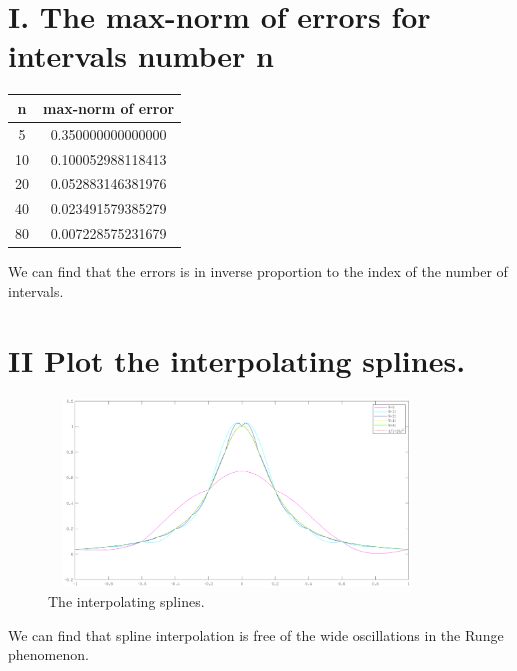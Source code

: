 \documentclass[twoside,a4paper]{article}
\begin{document}
\pagestyle{fancy}
\fancyhead{}


\section*{I. The max-norm of errors for intervals number n}
\begin{tabular}{|c|c|}
\hline
n&max-norm of error\\
\hline
5&0.350000000000000\\
\hline
10&0.100052988118413\\
\hline
20&0.052883146381976\\
\hline
40&0.023491579385279\\
\hline
80&0.007228575231679\\
\hline
\end{tabular}

We can find that the errors is in inverse proportion to the index of the number of intervals.

\section*{II \small{Plot the interpolating splines.}}

\begin{figure}[h]
	\centering
	\includegraphics[width=10cm, height=5cm]{Plot.eps}
	\caption{The interpolating splines.}
\end{figure}

We can find that spline interpolation is free of the wide oscillations in the Runge phenomenon.
\end{document}
